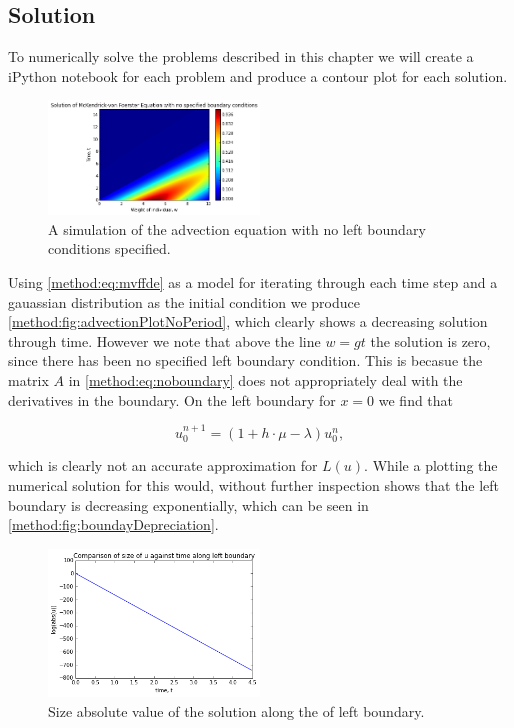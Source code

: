 \documentclass[../main.tex]{subfiles}
\begin{document}
  \subsection{Solution}
  To numerically solve the problems described in this chapter we will create a iPython notebook for each problem and produce a contour plot for each solution.

  \begin{figure}[htb]
    \centering
    \includegraphics[width=0.5\textwidth]{_assets/advection_noPeriod.png}
    \caption{\label{method:fig:advectionPlotNoPeriod} A simulation of the advection equation with no left boundary conditions specified.}
  \end{figure}

  Using \autoref{method:eq:mvffde} as a model for iterating through each time step and a gauassian distribution as the initial condition we produce \autoref{method:fig:advectionPlotNoPeriod}, which clearly shows a decreasing solution through time. However we note that above the line $w = gt$ the solution is zero, since there has been no specified left boundary condition. This is becasue the matrix $A$ in \autoref{method:eq:noboundary} does not appropriately deal with the derivatives in the boundary. On the left boundary for $x = 0$ we find that

  \begin{equation}
    u^{n+1}_0 = \left( 1 + h \cdot \mu - \lambda \right) u^n_0,
  \end{equation}

  which is clearly not an accurate approximation for $L(u)$. While a plotting the numerical solution for this would, without further inspection shows that the left boundary is decreasing exponentially, which can be seen in \autoref{method:fig:boundayDepreciation}.

  \begin{figure}[htb]
    \centering
    \includegraphics[width=0.5\textwidth]{_assets/uBoundary.png}
    \caption{\label{method:fig:boundayDepreciation} Size absolute value of the solution along the of left boundary.}
  \end{figure}
\end{document}
